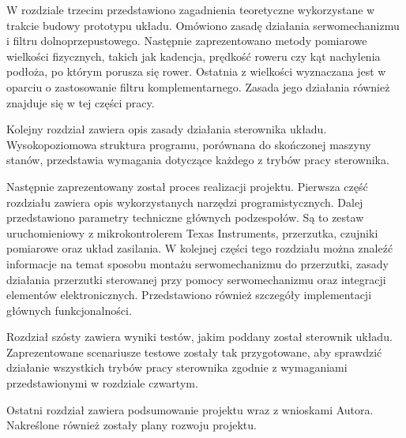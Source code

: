 W rozdziale trzecim przedstawiono zagadnienia teoretyczne wykorzystane w trakcie budowy prototypu układu. Omówiono zasadę działania serwomechanizmu i filtru dolnoprzepustowego. Następnie zaprezentowano metody pomiarowe wielkości fizycznych, takich jak kadencja, prędkość roweru czy kąt nachylenia podłoża, po którym porusza się rower. Ostatnia z wielkości wyznaczana jest w oparciu o zastosowanie filtru komplementarnego. Zasada jego działania również znajduje się w tej części pracy.

Kolejny rozdział zawiera opis zasady działania sterownika układu. Wysokopoziomowa struktura programu, porównana do skończonej maszyny stanów, przedstawia wymagania dotyczące każdego z trybów pracy sterownika. 

Następnie zaprezentowany został proces realizacji projektu. Pierwsza część rozdziału zawiera opis wykorzystanych narzędzi programistycznych. Dalej przedstawiono parametry techniczne głównych podzespołów. Są to zestaw uruchomieniowy z mikrokontrolerem Texas Instruments, przerzutka, czujniki pomiarowe oraz układ zasilania. W kolejnej części tego rozdziału można znaleźć informacje na temat sposobu montażu serwomechanizmu do przerzutki, zasady działania przerzutki sterowanej przy pomocy serwomechanizmu oraz integracji elementów elektronicznych. Przedstawiono również szczegóły implementacji głównych funkcjonalności.

Rozdział szósty zawiera wyniki testów, jakim poddany został sterownik układu. Zaprezentowane scenariusze testowe zostały tak przygotowane, aby sprawdzić działanie wszystkich trybów pracy sterownika zgodnie z wymaganiami przedstawionymi w rozdziale czwartym.

Ostatni rozdział zawiera podsumowanie projektu wraz z wnioskami Autora. Nakreślone również zostały plany rozwoju projektu.